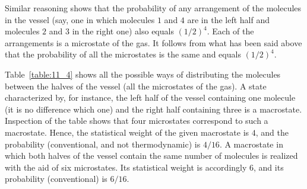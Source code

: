 Similar reasoning shows that the probability of any arrangement of the molecules in the vessel (say, one in which molecules $1$ and $4$ are in the left half and molecules $2$ and $3$ in the right one) also equals $(1/2)^4$. Each of the arrangements is a microstate of the gas. It follows from what has been said above that the probability of all the microstates is the same and equals $(1/2)^4$.

Table~\ref{table:11_4} shows all the possible ways of distributing the molecules between the halves of the vessel (all the microstates of the gas). A state characterized by, for instance, the left half of the vessel containing one molecule (it is no difference which one) and the right half containing three is a macrostate. Inspection of the table shows that four microstates correspond to such a macrostate. Hence, the statistical weight of the given macrostate is $4$, and the probability (conventional, and not thermodynamic) is $4/16$. A macrostate in which both halves of the vessel contain the same number of molecules is realized with the aid of six microstates. Its statistical weight is accordingly $6$, and its probability (conventional) is $6/16$.

